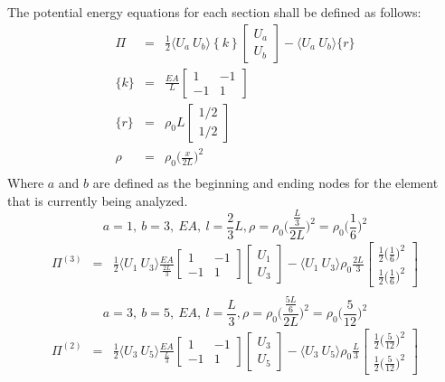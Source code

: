 \documentclass[a4paper]{article}
\begin{document}
The potential energy equations for each section shall be defined as follows:
\begin{eqnarray*}
\Pi & = & \frac{1}{2} \langle U_{a} \ U_{b} \rangle \left\{  k \right \}  \begin{bmatrix}
U_{a} \\ 
U_{b}
\end{bmatrix} - \langle U_{a} \ U_{b} \rangle \{ r \} \\
\{ k \}
& = &
\frac{EA}{L}
\begin{bmatrix}
1 & -1 \\
-1 & 1
\end{bmatrix}\\
\{ r \} & = &
\rho_{0}L 
\begin{bmatrix}
1/2 \\
1/2
\end{bmatrix}\\
\rho & = & \rho_{0}\Big(\frac{x}{2L}\Big)^{2}\\
\end{eqnarray*}
Where $a$ and $b$ are defined as the beginning and ending nodes for the element that is currently being analyzed.\\
$$a = 1, \ b = 3, \ EA, \ l = \frac{2}{3}L, \rho = \rho_{0}\Big(\frac{\frac{L}{3}}{2L}\Big)^{2} = \rho_{0}\Big(\frac{1}{6}\Big)^{2}$$
\begin{eqnarray*}
\Pi^{(3)} & = & \frac{1}{2} \langle U_{1} \ U_{3} \rangle \frac{EA}{\frac{2L}{3}}
\begin{bmatrix}
1 & -1 \\
-1 & 1
\end{bmatrix}  \begin{bmatrix}
U_{1} \\ 
U_{3}
\end{bmatrix} - \langle U_{1} \ U_{3} \rangle \rho_{0}\frac{2L}{3} 
\begin{bmatrix}
\frac{1}{2}\Big(\frac{1}{6}\Big)^{2} \\
\frac{1}{2}\Big(\frac{1}{6}\Big)^{2}
\end{bmatrix} \\
\end{eqnarray*}
\pagebreak
$$a = 3, \ b = 5, \ EA, \ l = \frac{L}{3}, \rho = \rho_{0}\Big(\frac{\frac{5L}{6}}{2L}\Big)^{2} = \rho_{0}\Big(\frac{5}{12}\Big)^{2}$$
\begin{eqnarray*}
\Pi^{(2)} & = & \frac{1}{2} \langle U_{3} \ U_{5} \rangle \frac{EA}{\frac{L}{3}}
\begin{bmatrix}
1 & -1 \\
-1 & 1
\end{bmatrix}  \begin{bmatrix}
U_{3} \\ 
U_{5}
\end{bmatrix} - \langle U_{3} \ U_{5} \rangle \rho_{0}\frac{L}{3} 
\begin{bmatrix}
\frac{1}{2}\Big(\frac{5}{12}\Big)^{2} \\
\frac{1}{2}\Big(\frac{5}{12}\Big)^{2}
\end{bmatrix} \\
\end{eqnarray*}
\end{document}
